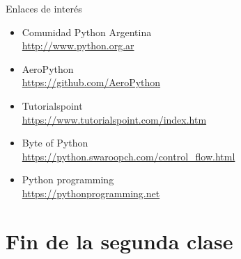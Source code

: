 \documentclass[10pt]{beamer}
\begin{document}
\begin{frame}{Enlaces de interés}
	\begin{itemize}
		\item \alert{Comunidad Python Argentina}\\ \url{http://www.python.org.ar}
		\item \alert{AeroPython}\\ \url{https://github.com/AeroPython}
		\item \alert{Tutorialspoint}\\ \url{https://www.tutorialspoint.com/index.htm}
		\item \alert{Byte of Python}\\ \url{https://python.swaroopch.com/control_flow.html}
		\item \alert{Python programming}\\ \url{https://pythonprogramming.net}
	\end{itemize}
\end{frame}
\section{Fin de la segunda clase}
\end{document}

